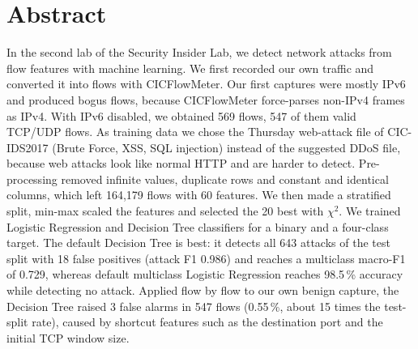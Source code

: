 \chapter*{Abstract}

In the second lab of the Security Insider Lab, we detect network attacks from flow features with machine learning. We first recorded our own traffic and converted it into flows with CICFlowMeter. Our first captures were mostly IPv6 and produced bogus flows, because CICFlowMeter force-parses non-IPv4 frames as IPv4. With IPv6 disabled, we obtained 569 flows, 547 of them valid TCP/UDP flows. As training data we chose the Thursday web-attack file of CIC-IDS2017 (Brute Force, XSS, SQL injection) instead of the suggested DDoS file, because web attacks look like normal HTTP and are harder to detect. Pre-processing removed infinite values, duplicate rows and constant and identical columns, which left 164,179 flows with 60 features. We then made a stratified split, min-max scaled the features and selected the 20 best with $\chi^2$. We trained Logistic Regression and Decision Tree classifiers for a binary and a four-class target. The default Decision Tree is best: it detects all 643 attacks of the test split with 18 false positives (attack F1 0.986) and reaches a multiclass macro-F1 of 0.729, whereas default multiclass Logistic Regression reaches 98.5\,\% accuracy while detecting no attack. Applied flow by flow to our own benign capture, the Decision Tree raised 3 false alarms in 547 flows (0.55\,\%, about 15 times the test-split rate), caused by shortcut features such as the destination port and the initial TCP window size.
